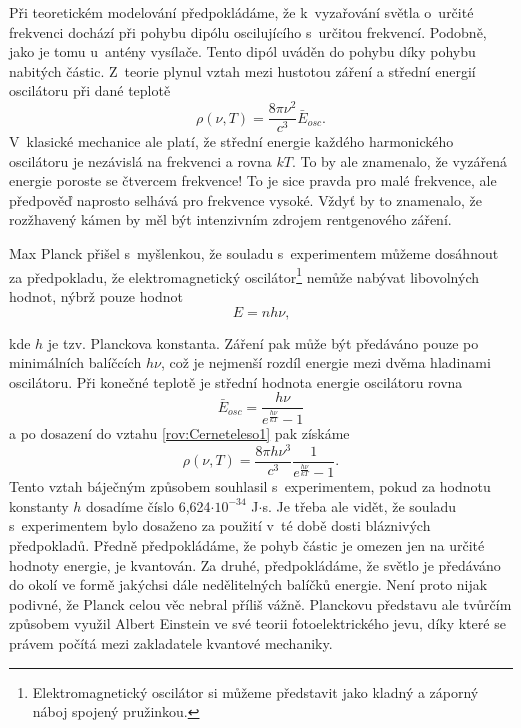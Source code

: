Při teoretickém modelování předpokládáme, že k~vyzařování světla o~určité frekvenci dochází při pohybu dipólu oscilujícího s~určitou frekvencí. Podobně, jako je tomu u~antény vysílače. Tento dipól uváděn do pohybu díky pohybu nabitých částic. Z~teorie plynul vztah mezi hustotou záření a střední energií oscilátoru při dané teplotě
\begin{equation}
\rho(\nu,T)=\frac{8\pi\nu^2}{c^3}\bar{E}_{osc}\mbox{.}
\label{rov:Cerneteleso1}
\end{equation}
V~klasické mechanice ale platí, že střední energie každého harmonického oscilátoru je nezávislá na frekvenci a rovna $kT$. To by ale znamenalo, že vyzářená energie poroste se čtvercem frekvence! To je sice pravda pro malé frekvence, ale předpověď naprosto selhává pro frekvence vysoké. Vždyť by to znamenalo, že rozžhavený kámen by měl být intenzivním zdrojem rentgenového záření. 

Max Planck přišel s~myšlenkou, že souladu s~experimentem můžeme dosáhnout za předpokladu, že elektromagnetický oscilátor\footnote{ Elektromagnetický oscilátor si můžeme představit jako kladný a záporný náboj spojený pružinkou.} nemůže nabývat libovolných hodnot, nýbrž pouze hodnot
\begin{equation}
E=nh\nu\mbox{,}
\label{rov:Cerneteleso2}
\end{equation}

\noindent kde $h$ je tzv. Planckova konstanta. Záření pak může být předáváno pouze po minimálních balíčcích $h\nu$, což je nejmenší rozdíl energie mezi dvěma hladinami oscilátoru. Při konečné teplotě je střední hodnota energie oscilátoru rovna
\begin{equation}
\bar{E}_{osc}=\frac{h\nu}{e^{\frac{h\nu}{kT}}-1}\mbox{}
\label{rov:Cerneteleso3}
\end{equation}
a po dosazení do vztahu \ref{rov:Cerneteleso1} pak získáme
\begin{equation}
\boxed{\rho(\nu,T) = \frac{8\pi h\nu^3}{c^3}\frac{1}{e^{\frac{h\nu}{kT}}-1}\mbox{.}}
\label{rov:Cerneteleso4}
\end{equation}
Tento vztah báječným způsobem souhlasil s~experimentem, pokud za hodnotu konstanty $h$ dosadíme číslo 6,624$\cdot10^{-34}$ J$\cdot$s. Je třeba ale vidět, že souladu s~experimentem bylo dosaženo za použití v~té době dosti bláznivých předpokladů. Předně předpokládáme, že pohyb částic je omezen jen na určité hodnoty energie, je kvantován. Za druhé, předpokládáme, že světlo je předáváno do okolí ve formě jakýchsi dále nedělitelných balíčků energie. Není proto nijak podivné, že Planck celou věc nebral příliš vážně. Planckovu představu ale tvůrčím způsobem využil Albert Einstein ve své teorii fotoelektrického jevu, díky které se právem počítá mezi zakladatele kvantové mechaniky.

